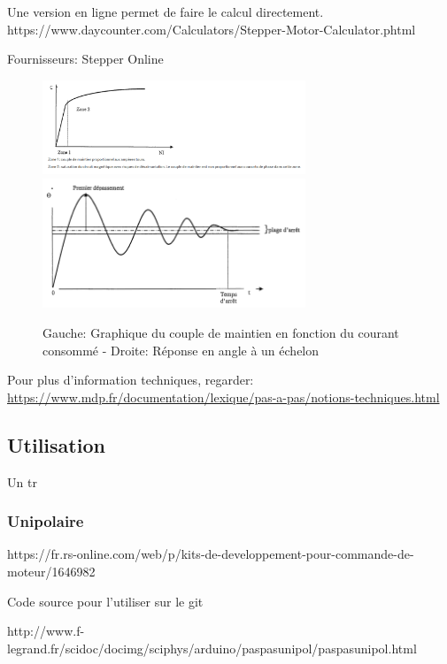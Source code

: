 \documentclass[a4paper, 11pt]{report}
\begin{document}
Une version en ligne permet de faire le calcul directement.
https://www.daycounter.com/Calculators/Stepper-Motor-Calculator.phtml

Fournisseurs: Stepper Online

\begin{figure}
\begin{centering}
\caption{Gauche: Graphique du couple de maintien en fonction du courant consommé - Droite: Réponse en angle à un échelon}
\includegraphics[width=0.7\textwidth]{images/CoupleMaintien.png}
\includegraphics[width=0.7\textwidth]{images/reponse_indicielleMPP.png}
\par\end{centering}
\end{figure}

Pour plus d'information techniques, regarder: \url{https://www.mdp.fr/documentation/lexique/pas-a-pas/notions-techniques.html}

\subsection{Utilisation}
Un tr

\subsubsection{Unipolaire}

https://fr.rs-online.com/web/p/kits-de-developpement-pour-commande-de-moteur/1646982

Code source pour l'utiliser sur le git

http://www.f-legrand.fr/scidoc/docimg/sciphys/arduino/paspasunipol/paspasunipol.html
\end{document}
